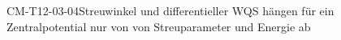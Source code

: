 
\begin{CONC}{CM-T12-03-04}{Streuwinkel und differentieller WQS hängen für ein Zentralpotential nur von von Streuparameter und Energie ab}
\end{CONC}
